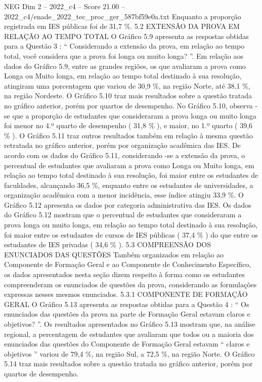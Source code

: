 \begin{textsample}{NEG Dim 2 – 2022\_c4 – Score 21.00 – 2022\_c4/enade\_2022\_tec\_proc\_ger\_587bf59e0a.txt}
Enquanto a proporção registrada em IES públicas foi de 31,7 \%. 5.2 EXTENSÃO DA PROVA EM RELAÇÃO AO TEMPO TOTAL O Gráfico 5.9 apresenta as respostas obtidas para a Questão 3 : “ Considerando a extensão da prova, em relação ao tempo total, você considera que a prova foi longa ou muito longa? ”.
Em relação aos dados do Gráfico 5.9, entre as grandes regiões, os que avaliaram a prova como Longa ou Muito longa, em relação ao tempo total destinado à sua resolução, atingiram uma porcentagem que variou de 30,9 \%, na região Norte, até 38,1 \%, na região Nordeste.
O Gráfico 5.10 traz mais resultados sobre a questão tratada no gráfico anterior, porém por quartos de desempenho.
No Gráfico 5.10, observa -se que a proporção de estudantes que consideraram a prova longa ou muito longa foi menor no 4.º quarto de desempenho ( 31,8 \% ), e maior, no 1.º quarto ( 39,6 \% ).
O Gráfico 5.11 traz outros resultados também em relação à mesma questão retratada no gráfico anterior, porém por organização acadêmica das IES.
De acordo com os dados do Gráfico 5.11, considerando -se a extensão da prova, o percentual de estudantes que avaliaram a prova como Longa ou Muito longa, em relação ao tempo total destinado à sua resolução, foi maior entre os estudantes de faculdades, alcançando 36,5 \%, enquanto entre os estudantes de universidades, a organização acadêmica com a menor incidência, esse índice atingiu 33,9 \%.
O Gráfico 5.12 apresenta os dados por categoria administrativa das IES.
Os dados do Gráfico 5.12 mostram que o percentual de estudantes que consideraram a prova longa ou muito longa, em relação ao tempo total destinado à sua resolução, foi maior entre os estudantes de cursos de IES públicas ( 37,4 \% ) do que entre os estudantes de IES privadas ( 34,6 \% ). 5.3 COMPREENSÃO DOS ENUNCIADOS DAS QUESTÕES Também organizados em relação ao Componente de Formação Geral e ao Componente de Conhecimento Específico, os dados apresentados nesta seção dizem respeito à forma como os estudantes compreenderam os enunciados de questões da prova, considerando as formulações expressas nesses mesmos enunciados. 5.3.1 COMPONENTE DE FORMAÇÃO GERAL O Gráfico 5.13 apresenta as respostas obtidas para a Questão 4 : “ Os enunciados das questões da prova na parte de Formação Geral estavam claros e objetivos? ”.
Os resultados apresentados no Gráfico 5.13 mostram que, na análise regional, a percentagem de estudantes que avaliaram que todos ou a maioria dos enunciados das questões do Componente de Formação Geral estavam “ claros e objetivos ” variou de 79,4 \%, na região Sul, a 72,5 \%, na região Norte.
O Gráfico 5.14 traz mais resultados sobre a questão tratada no gráfico anterior, porém por quartos de desempenho.

\end{textsample}
